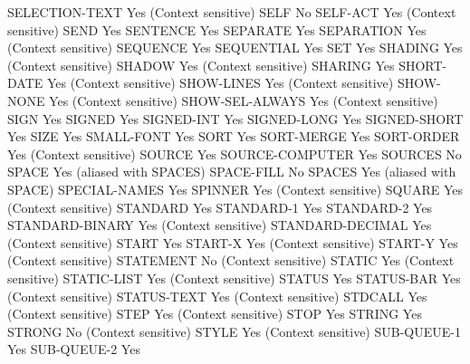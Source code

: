 SELECTION-TEXT                  Yes (Context sensitive)
SELF                            No
SELF-ACT                        Yes (Context sensitive)
SEND                            Yes
SENTENCE                        Yes
SEPARATE                        Yes
SEPARATION                      Yes (Context sensitive)
SEQUENCE                        Yes
SEQUENTIAL                      Yes
SET                             Yes
SHADING                         Yes (Context sensitive)
SHADOW                          Yes (Context sensitive)
SHARING                         Yes
SHORT-DATE                      Yes (Context sensitive)
SHOW-LINES                      Yes (Context sensitive)
SHOW-NONE                       Yes (Context sensitive)
SHOW-SEL-ALWAYS                 Yes (Context sensitive)
SIGN                            Yes
SIGNED                          Yes
SIGNED-INT                      Yes
SIGNED-LONG                     Yes
SIGNED-SHORT                    Yes
SIZE                            Yes
SMALL-FONT                      Yes
SORT                            Yes
SORT-MERGE                      Yes
SORT-ORDER                      Yes (Context sensitive)
SOURCE                          Yes
SOURCE-COMPUTER                 Yes
SOURCES                         No
SPACE                           Yes (aliased with SPACES)
SPACE-FILL                      No
SPACES                          Yes (aliased with SPACE)
SPECIAL-NAMES                   Yes
SPINNER                         Yes (Context sensitive)
SQUARE                          Yes (Context sensitive)
STANDARD                        Yes
STANDARD-1                      Yes
STANDARD-2                      Yes
STANDARD-BINARY                 Yes (Context sensitive)
STANDARD-DECIMAL                Yes (Context sensitive)
START                           Yes
START-X                         Yes (Context sensitive)
START-Y                         Yes (Context sensitive)
STATEMENT                       No (Context sensitive)
STATIC                          Yes (Context sensitive)
STATIC-LIST                     Yes (Context sensitive)
STATUS                          Yes
STATUS-BAR                      Yes (Context sensitive)
STATUS-TEXT                     Yes (Context sensitive)
STDCALL                         Yes (Context sensitive)
STEP                            Yes (Context sensitive)
STOP                            Yes
STRING                          Yes
STRONG                          No (Context sensitive)
STYLE                           Yes (Context sensitive)
SUB-QUEUE-1                     Yes
SUB-QUEUE-2                     Yes
